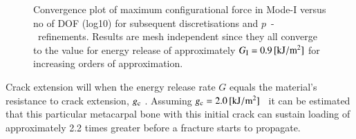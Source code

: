 \documentclass[review]{elsarticle}
\numberwithin{equation}{section}
\begin{document}
\begin{figure}
	\centering
	
	\caption{Convergence plot of maximum configurational force in Mode-I versus no of DOF (log10) for subsequent discretisations and $p$~-~refinements. Results are mesh independent since they all converge to the value for energy release of approximately $ G_{\rm I} = 0.9 \, [\mathrm{kJ} / \mathrm{m}^2]$ for increasing orders of approximation. }
	\label{fig:max_g1_convergece}
\end{figure}
Crack extension will when the energy release rate $G$ equals the material's resistance to crack extension, $g_{\rm c}$ . 
Assuming $g_{\rm c} = 2.0\,[\mathrm{ kJ/m^2}]$~\citep{gasser2007numerical} it can be estimated that this particular metacarpal bone with this initial crack can sustain loading of approximately 2.2 times greater before a fracture starts to propagate. 
\end{document}
